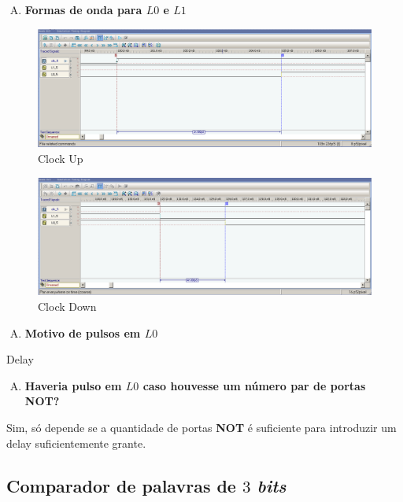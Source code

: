 \documentclass[12pt]{article}
\begin{document}
\begin{enumerate}[C)]
\item \textbf{Formas de onda para \(L0\) e \(L1\)}
\end{enumerate}

\begin{figure}[H]
    \centering
    \includegraphics[width=.9\textwidth]{Exp04/exp4_2.0_c_clk_up.png}
    \caption{Clock Up}\label{fig:exp4_2.0_c_clk_up.png}
\end{figure}

\begin{figure}[H]
    \centering
    \includegraphics[width=.9\textwidth]{Exp04/exp4_2.0_c_clk_down.png}
    \caption{Clock Down}\label{fig:exp4_2.0_c_clk_down.png}
\end{figure}

\begin{enumerate}[D)]
\item \textbf{Motivo de pulsos em \(L0\)}
\end{enumerate}

Delay

\begin{enumerate}[E)]
\item \textbf{Haveria pulso em \(L0\) caso houvesse um número par de portas \textbf{NOT}?}
\end{enumerate}

Sim, só depende se a quantidade de portas \textbf{NOT} é suficiente para
introduzir um delay suficientemente grante.

\subsection{Comparador de palavras de \(3\) \emph{bits}}\label{sec:comparador_de_palavras_3_bits}
\end{document}
